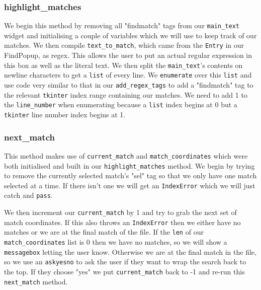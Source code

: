 \documentclass[a4paper,11pt,openany]{book}
\begin{document}
\subsubsection{highlight\_matches}

We begin this method by removing all "findmatch" tags from our \lstinline[columns=fixed]{main_text} widget and initialising a couple of variables which we will use to keep track of our matches. We then compile \lstinline[columns=fixed]{text_to_match}, which came from the \lstinline[columns=fixed]{Entry} in our FindPopup, as regex. This allows the user to put an actual regular expression in this box as well as the literal text. We then split the \lstinline[columns=fixed]{main_text}'s contents on newline characters to get a \lstinline[columns=fixed]{list} of every line. We \lstinline[columns=fixed]{enumerate} over this \lstinline[columns=fixed]{list} and use code very similar to that in our \lstinline[columns=fixed]{add_regex_tags} to add a "findmatch" tag to the relevant \lstinline[columns=fixed]{tkinter} index range containing our matches. We need to add 1 to the \lstinline[columns=fixed]{line_number} when enumerating because a \lstinline[columns=fixed]{list} index begins at 0 but a \lstinline[columns=fixed]{tkinter} line number index begins at 1.

\subsubsection{next\_match}

This method makes use of \lstinline[columns=fixed]{current_match} and \lstinline[columns=fixed]{match_coordinates} which were both initialised and built in our \lstinline[columns=fixed]{highlight_matches} method. We begin by trying to remove the currently selected match's "sel" tag so that we only have one match selected at a time. If there isn't one we will get an \lstinline[columns=fixed]{IndexError} which we will just catch and \lstinline[columns=fixed]{pass}. 

\vspace{5mm}

We then increment our \lstinline[columns=fixed]{current_match} by 1 and try to grab the next set of match coordinates. If this also throws an \lstinline[columns=fixed]{IndexError} then we either have no matches or we are at the final match of the file. If the \lstinline[columns=fixed]{len} of our \lstinline[columns=fixed]{match_coordinates} list is 0 then we have no matches, so we will show a \lstinline[columns=fixed]{messagebox} letting the user know. Otherwise we are at the final match in the file, so we use an \lstinline[columns=fixed]{askyesno} to ask the user if they want to wrap the search back to the top. If they choose "yes" we put \lstinline[columns=fixed]{current_match} back to -1 and re-run this \lstinline[columns=fixed]{next_match} method. 
\end{document}
